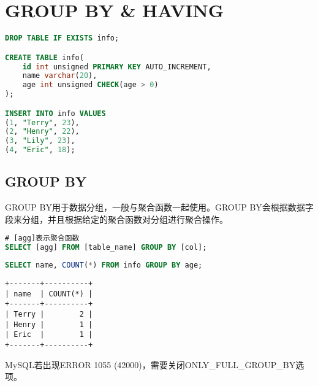 \documentclass[12pt, openany, oneside]{book}
\begin{document}
\newpage

\chapter{GROUP BY \& HAVING}

\vspace{0.5cm}


\begin{lstlisting}[language=SQL]
DROP TABLE IF EXISTS info;

CREATE TABLE info(
    id int unsigned PRIMARY KEY AUTO_INCREMENT,
    name varchar(20),
    age int unsigned CHECK(age > 0)
);

INSERT INTO info VALUES
(1, "Terry", 23),
(2, "Henry", 22),
(3, "Lily", 23),
(4, "Eric", 18);
\end{lstlisting}

\vspace{0.5cm}

\section{GROUP BY}

GROUP BY用于数据分组，一般与聚合函数一起使用。GROUP BY会根据数据字段来分组，并且根据给定的聚合函数对分组进行聚合操作。

\vspace{-0.5cm}

\begin{lstlisting}[language=SQL]
# [agg]表示聚合函数
SELECT [agg] FROM [table_name] GROUP BY [col];
\end{lstlisting}

\vspace{0.5cm}


\begin{lstlisting}[language=SQL]
SELECT name, COUNT(*) FROM info GROUP BY age;
\end{lstlisting}

\begin{tcolorbox}
	\begin{verbatim}
+-------+----------+
| name  | COUNT(*) |
+-------+----------+
| Terry |        2 |
| Henry |        1 |
| Eric  |        1 |
+-------+----------+
	\end{verbatim}
\end{tcolorbox}

MySQL若出现ERROR 1055 (42000)，需要关闭ONLY\_FULL\_GROUP\_BY选项。
\end{document}
